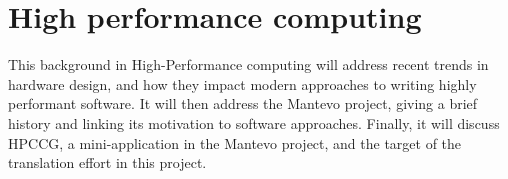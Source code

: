 









\section{High performance computing}
\label{sec:hpc} %

This background in High-Performance computing will address recent trends in hardware design, and how they impact modern approaches to writing highly performant software. It will then address the Mantevo project, giving a brief history and linking its motivation to software approaches. Finally, it will discuss HPCCG, a mini-application in the Mantevo project, and the target of the translation effort in this project.

